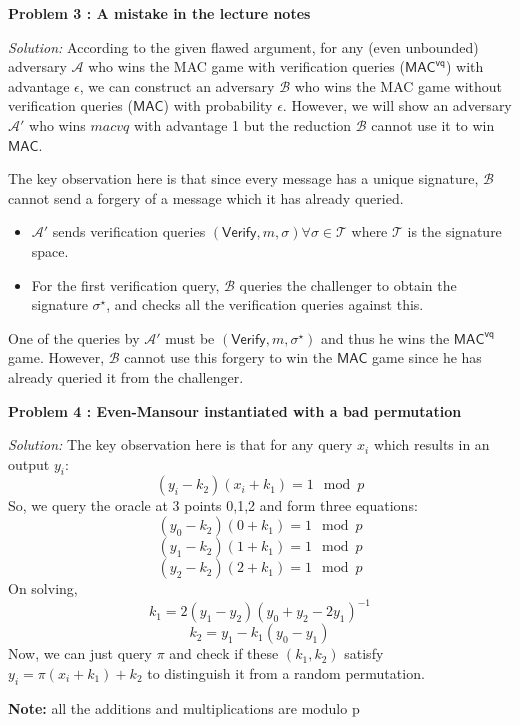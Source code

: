 \documentclass[a4paper, 11pt]{article}
\newenvironment{solution}
    {\textit{Solution:}}
    {\clearpage}
\newcommand{\prob}[1]{\begin{mdframed}[backgroundcolor=gray!20] \textbf{Problem #1}\end{mdframed}}
\newcommand{\verify}{\mathsf{Verify}}
\newcommand{\macvq}{\mathsf{MAC^{vq}}}
\newcommand{\mac}{\mathsf{MAC}}
\newcommand{\calA}{\mathcal{A}}
\newcommand{\calB}{\mathcal{B}}
\newcommand{\calT}{\mathcal{T}}
\begin{document}
\prob{3 : A mistake in the lecture notes}
\begin{solution}
    According to the given flawed argument, for any (even unbounded) adversary $\calA$ who wins the MAC game with verification queries ($\macvq$) with advantage $\epsilon$, we can construct an adversary $\calB$ who wins the MAC game without verification queries ($\mac$) with probability $\epsilon$. However, we will show an adversary $\calA'$ who wins  $macvq$ with advantage 1 but the reduction $\calB$ cannot use it to win $\mac$.

    The key observation here is that since every message has a unique signature, $\calB$ cannot send a forgery of a message which it has already queried.
    \begin{itemize}
        \item $\calA'$ sends verification queries $(\verify , m, \sigma) \forall \sigma\in\calT$ where $\calT$ is the signature space.
        \item For the first verification query, $\calB$ queries the challenger to obtain the signature $\sigma^\star$, and checks all the verification queries against this.
    \end{itemize}
    One of the queries by $\calA'$ must be $(\verify , m, \sigma^\star)$ and thus he wins the $\macvq$ game. However, $\calB$ cannot use this forgery to win the $\mac$ game since he has already queried it from the challenger.

\end{solution}


\prob{4 : Even-Mansour instantiated with a bad permutation}
\begin{solution}
    The key observation here is that for any query $x_i$ which results in an output $y_i$:
    $$(y_i-k_2)(x_i+k_1)=1 \mod p$$
    So, we query the oracle at 3 points 0,1,2 and form three equations:
    $$(y_0-k_2)(0+k_1)=1 \mod p$$
    $$(y_1-k_2)(1+k_1)=1 \mod p$$
    $$(y_2-k_2)(2+k_1)=1 \mod p$$
    On solving,
    $$k_1=2(y_1-y_2)(y_0+y_2-2y_1)^{-1}$$
    $$k_2=y_1-k_1(y_0-y_1)$$
    Now, we can just query $\pi$ and check if these $(k_1,k_2)$ satisfy $y_i=\pi(x_i+k_1)+k_2$ to distinguish it from a random permutation.

    \noindent\textbf{Note:} all the additions and multiplications are modulo p
\end{solution}
\end{document}
